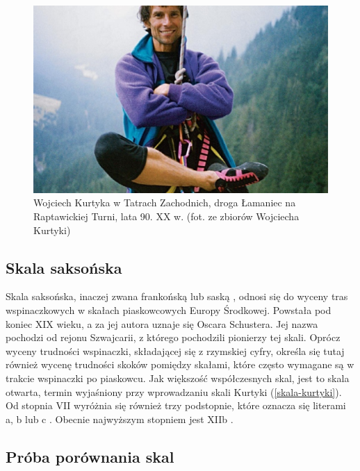 \documentclass{article}
\begin{document}
\begin{figure}[!htbp]
	\begin{center}
		\includegraphics[width=0.9\linewidth]{images/kurtyka.eps}
	\end{center}
	\caption{Wojciech Kurtyka w Tatrach Zachodnich, droga Łamaniec na Raptawickiej Turni, lata 90. XX w. (fot. ze zbiorów Wojciecha Kurtyki) \cite{tyg-powszechni-kurtyka}}
	\label{kurtyka}
\end{figure}

\subsection{Skala saksońska}
Skala saksońska, inaczej zwana frankońską \cite{skalnik-skale} lub saską \cite{drytooling-skale}, odnosi się do wyceny tras wspinaczkowych w skałach piaskowcowych Europy Środkowej. Powstała pod koniec XIX wieku, a za jej autora uznaje się Oscara Schustera. Jej nazwa pochodzi od rejonu Szwajcarii, z którego pochodzili pionierzy tej skali. Oprócz wyceny trudności wspinaczki, składającej się z rzymskiej cyfry, określa się tutaj również wycenę trudności skoków pomiędzy skałami, które często wymagane są w trakcie wspinaczki po piaskowcu. Jak większość współczesnych skal, jest to skala otwarta, termin wyjaśniony przy wprowadzaniu skali Kurtyki (\ref{skala-kurtyki}). Od stopnia VII wyróżnia się również trzy podstopnie, które oznacza się literami a, b lub c \cite{climb-skale}. Obecnie najwyższym stopniem jest XIIb \cite{skalnik-skale}.

\subsection{Próba porównania skal}
\label{porownanie}
\end{document}
